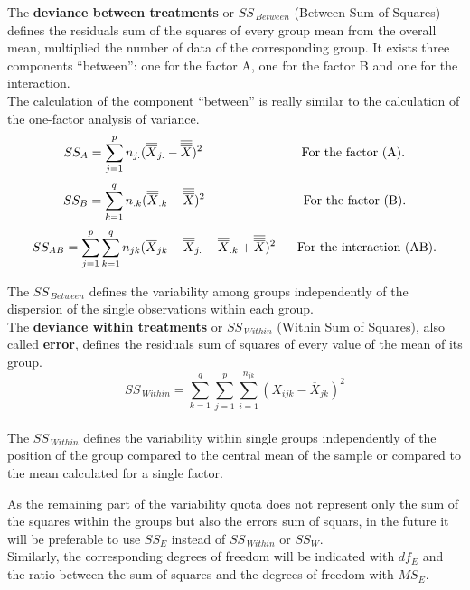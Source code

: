 \begin{frame}
  The \textbf{deviance between treatments} or {\boldmath$SS_{\,Between}$} (Between Sum of Squares) defines the residuals sum of the squares of every group mean from the overall mean, multiplied the number of data of the corresponding group.  It exists three components ``between'': one for the factor A, one for the factor B and one for the interaction.\\
  The calculation of the component ``between'' is really similar to the calculation of the one-factor analysis of variance.\\
  $$ SS_A = \sum_{j=1}^p{n_{j.}(\overline{\overline{X}}_{j.}-\overline{\overline{\overline{X}}})^2}\mbox{\hspace*{2.75cm}For the factor  (A).} $$
  $$ SS_B = \sum_{k=1}^q{n_{.k}(\overline{\overline{X}}_{.k}-\overline{\overline{\overline{X}}})^2}\mbox{\hspace*{2.75cm}For the factor (B).} $$
  $$ SS_{AB} = \sum_{j=1}^p{\sum_{k=1}^q{n_{jk}(\overline{X}_{jk}-\overline{\overline{X}}_{j.}-\overline{\overline{X}}_{.k}+\overline{\overline{\overline{X}}})^2}}\mbox{\hspace*{.6cm}For the interaction (AB).} $$
\end{frame}

\begin{frame}
  \vspace*{.25cm} 
  The {\boldmath$SS_{\,Between}$} defines the variability among groups independently of the dispersion of the single observations within each group.\\
  \vspace*{.5cm} 
  The \textbf{deviance within treatments} or {\boldmath$SS_{\,Within}$} (Within Sum of Squares), also called \textbf{error}, defines the residuals sum of squares of every value of the mean of its group.\\
  $$ SS_{\,Within}=\sum_{k=1}^{q} \sum_{j=1}^{p} \sum_{i=1}^{n_{jk}}{(X_{ijk}-\overline{X}_{jk})^2} $$\\
  \vspace*{.25cm}
  The {\boldmath$SS_{\,Within}$} defines the variability within single groups independently of the position of the group compared to the central mean of the sample or compared to the mean calculated for a single factor. 
\end{frame}

\begin{frame}
  \vspace*{.75cm} 
  As the remaining part of the variability quota does not represent only the sum of the squares within the groups but also the errors sum of squars, in the future it will be preferable to use {\boldmath$SS_{E}$} instead of {\boldmath$SS_{\,Within}$} or {\boldmath$SS_{W}$}.\\
  \vspace*{.5cm} 
  Similarly, the corresponding degrees of freedom will be indicated with $ df_{E} $ and the ratio between the sum of squares and the degrees of freedom with $ MS_{E} $.
\end{frame}

